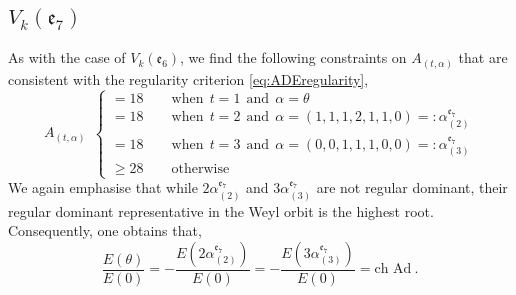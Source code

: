 \subsection{$V_k(\mathfrak{e}_7)$}

As with the case of $V_{k}(\mathfrak{e}_6)$, we find the following constraints on $A_{(t,\alpha)}$ that are consistent with the regularity criterion \eqref{eq:ADEregularity},
\begin{equation} \label{eq:Atconste7}
    A_{(t,\alpha)} \ \ \begin{cases}
        = 18 \qquad \text{when} \ \ t = 1 \ \ \text{and} \ \ \alpha = \theta \\ = 18 \qquad \text{when} \ \ t = 2 \ \ \text{and} \ \ \alpha = (1,1,1,2,1,1,0) =: \alpha^{\mathfrak{e}_7}_{(2)} \\ = 18 \qquad \text{when} \ \ t = 3 \ \ \text{and} \ \ \alpha = (0,0,1,1,1,0,0) =: \alpha^{\mathfrak{e}_7}_{(3)} \\ \geqslant 28 \qquad \text{otherwise}
    \end{cases}
\end{equation}
We again emphasise that while $2\alpha^{\mathfrak{e}_7}_{(2)}$ and $3\alpha^{\mathfrak{e}_7}_{(3)}$ are not regular dominant, their regular dominant representative in the Weyl orbit is the highest root. Consequently, one obtains that, 
\begin{equation}
    \frac{E(\theta)}{E(0)} = -\frac{E(2\alpha^{\mathfrak{e}_7}_{(2)})}{E(0)} = -\frac{E(3\alpha^{\mathfrak{e}_7}_{(3)})}{E(0)} = \text{ch Ad}~.
\end{equation}

